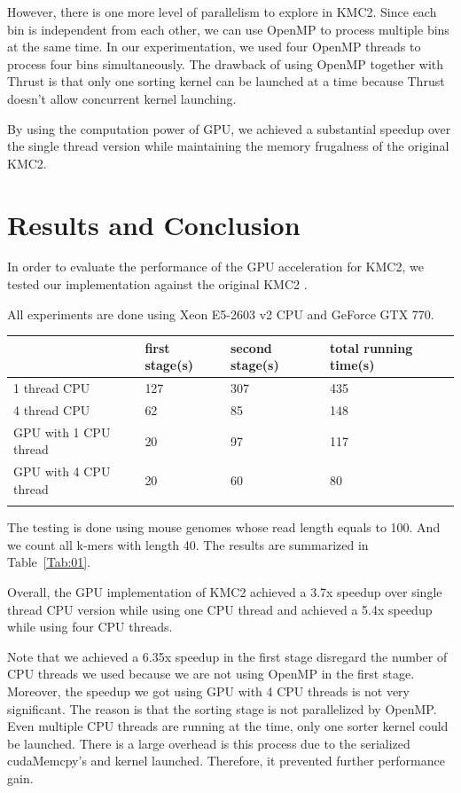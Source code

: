 \documentclass{bioinfo}
\begin{document}
\begin{methods}
However, there is one more level of parallelism to explore in KMC2. 
Since each bin is independent from each other, we can use OpenMP to process multiple bins at the same time. 
In our experimentation, we used four OpenMP threads to process four bins simultaneously. 
The drawback of using OpenMP together with Thrust is that only one sorting kernel can be launched at a time because Thrust doesn't allow concurrent kernel launching.

By using the computation power of GPU, we achieved a substantial speedup over the single thread version while maintaining the memory frugalness of the original KMC2.
\newline

\end{methods}



\section{Results and Conclusion}
In order to evaluate the performance of the GPU acceleration for KMC2, we tested our implementation against the original KMC2 \citep{Seb14}.

All experiments are done using Xeon E5-2603 v2 CPU and GeForce GTX 770.
\begin{table}[H]
 {\begin{tabular}{@{}llll@{}}\toprule  &
first stage(s) & second stage(s) & total running time(s)\\\midrule
1 thread CPU & 127 & 307 & 435\\
4 thread CPU & 62 & 85 & 148\\
GPU with 1 CPU thread & 20 & 97 & 117\\
GPU with 4 CPU thread & 20 & 60 & 80\\\botrule
\end{tabular}}{}
\end{table}

The testing is done using mouse genomes whose read length equals to 100. And we count all k-mers with length 40.
The results are summarized in Table~\ref{Tab:01}.

Overall, the GPU implementation of KMC2 achieved a 3.7x speedup over single thread CPU version while using one CPU thread and achieved a 5.4x speedup while using four CPU threads.

Note that we achieved a 6.35x speedup in the first stage disregard the number of CPU threads we used because we are not using OpenMP in the first stage. 
Moreover, the speedup we got using GPU with 4 CPU threads is not very significant.
The reason is that the sorting stage is not parallelized by OpenMP. Even multiple CPU threads are running at the time, only one sorter kernel could be launched. 
There is a large overhead is this process due to the serialized cudaMemcpy's and kernel launched. Therefore, it prevented further performance gain.
 
\end{document}
